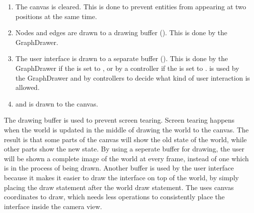 \begin{enumerate}
    \item The canvas is cleared. This is done to prevent entities from appearing at two positions at the same time.
    \item Nodes and edges are drawn to a drawing buffer (). This is done by the GraphDrawer.
    \item The user interface is drawn to a separate buffer (). This is done by the GraphDrawer if the  is set to , or by a controller if the  is set to .  is used by the GraphDrawer and by controllers to decide what kind of user interaction is allowed.
    \item {} and  is drawn to the canvas.
\end{enumerate}
The drawing buffer is used to prevent screen tearing. Screen tearing happens when the world is updated in the middle of drawing the world to the canvas. The result is that some parts of the canvas will show the old state of the world, while other parts show the new state. By using a seperate buffer for drawing, the user will be shown a complete image of the world at every frame, instead of one which is in the process of being drawn. Another buffer is used by the user interface because it makes it easier to draw the interface on top of the world, by simply placing the draw statement after the world draw statement. The  uses canvas coordinates to draw, which needs less operations to consistently place the interface inside the camera view.
\\[11pt]
